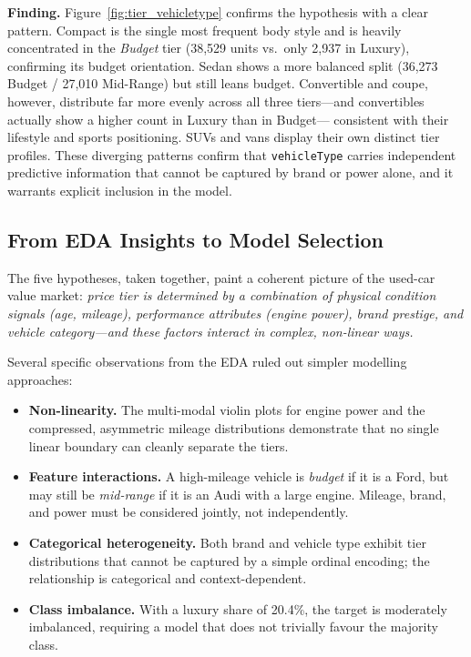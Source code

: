 \documentclass[12pt, a4paper]{article}
\begin{document}
\textbf{Finding.}  Figure~\ref{fig:tier_vehicletype} confirms the
hypothesis with a clear pattern.  Compact is the single most frequent
body style and is heavily concentrated in the \emph{Budget} tier
(38,529 units vs.\ only 2,937 in Luxury), confirming its budget
orientation.  Sedan shows a more balanced split (36,273 Budget /
27,010 Mid-Range) but still leans budget.  Convertible and coupe,
however, distribute far more evenly across all three tiers---and
convertibles actually show a higher count in Luxury than in Budget---
consistent with their lifestyle and sports positioning.  SUVs and vans
display their own distinct tier profiles.  These diverging patterns
confirm that \texttt{vehicleType} carries independent predictive
information that cannot be captured by brand or power alone, and it
warrants explicit inclusion in the model.
 
\subsection{From EDA Insights to Model Selection}
 
The five hypotheses, taken together, paint a coherent picture of the
used-car value market: \emph{price tier is determined by a combination
of physical condition signals (age, mileage), performance attributes
(engine power), brand prestige, and vehicle category---and these factors
interact in complex, non-linear ways.}
 
Several specific observations from the EDA ruled out simpler modelling
approaches:
 
\begin{itemize}
  \item \textbf{Non-linearity.}  The multi-modal violin plots for engine
        power and the compressed, asymmetric mileage distributions
        demonstrate that no single linear boundary can cleanly separate
        the tiers.
  \item \textbf{Feature interactions.}  A high-mileage vehicle is
        \emph{budget} if it is a Ford, but may still be \emph{mid-range}
        if it is an Audi with a large engine.  Mileage, brand, and power
        must be considered jointly, not independently.
  \item \textbf{Categorical heterogeneity.}  Both brand and vehicle type
        exhibit tier distributions that cannot be captured by a simple
        ordinal encoding; the relationship is categorical and
        context-dependent.
  \item \textbf{Class imbalance.}  With a luxury share of 20.4\%, the
        target is moderately imbalanced, requiring a model that does not
        trivially favour the majority class.
\end{itemize}
 
\end{document}
